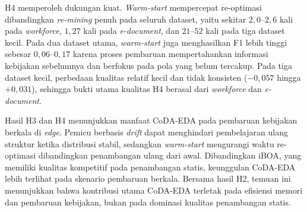 H4 memperoleh dukungan kuat. 
\textit{Warm-start} mempercepat re-optimasi dibandingkan \textit{re-mining} penuh pada seluruh dataset, yaitu sekitar $2,0$–$2,6$ kali pada \textit{workforce}, $1,27$ kali pada \textit{e-document}, dan $21$–$52$ kali pada tiga dataset kecil. 
Pada dua dataset utama, \textit{warm-start} juga menghasilkan F1 lebih tinggi sebesar $0,06$–$0,17$ karena proses pembaruan mempertahankan informasi kebijakan sebelumnya dan berfokus pada pola yang belum tercakup. 
Pada tiga dataset kecil, perbedaan kualitas relatif kecil dan tidak konsisten ($-0{,}057$ hingga $+0{,}031$), sehingga bukti utama kualitas H4 berasal dari \textit{workforce} dan \textit{e-document}.

Hasil H3 dan H4 menunjukkan manfaat CoDA-EDA pada pembaruan kebijakan berkala di \textit{edge}. 
Pemicu berbasis \textit{drift} dapat menghindari pembelajaran ulang struktur ketika distribusi stabil, sedangkan \textit{warm-start} mengurangi waktu re-optimasi dibandingkan penambangan ulang dari awal. 
Dibandingkan iBOA, yang memiliki kualitas kompetitif pada penambangan statis, keunggulan CoDA-EDA lebih terlihat pada skenario pembaruan berkala. 
Bersama hasil H2, temuan ini menunjukkan bahwa kontribusi utama CoDA-EDA terletak pada efisiensi memori dan pembaruan kebijakan, bukan pada dominasi kualitas penambangan statis.